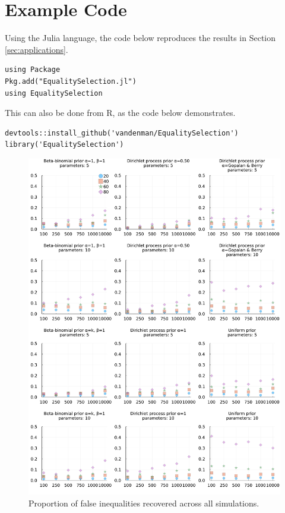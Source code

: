 \documentclass[11pt,a4paper]{article}
\theoremstyle{definition} %
\theoremstyle{case}
\begin{document}
\printbibliography

\newpage
\appendix

\section{Example Code} \label{sec:appendix-code}
Using the Julia language, the code below reproduces the results in Section \ref{sec:applications}.

\begin{verbatim}
using Package
Pkg.add("EqualitySelection.jl")
using EqualitySelection
\end{verbatim}

\noindent This can also be done from R, as the code below demonstrates.

\begin{verbatim}
devtools::install_github('vandenman/EqualitySelection')
library('EqualitySelection')
\end{verbatim}

\newpage

\begin{figure}
    \centering
    \includegraphics[width=\textwidth]{figures/simulation_results_test_clean_figures/simulation_appendix.pdf}
    \caption{Proportion of false inequalities recovered across all simulations.}
    \label{app_fig:big_simulation}
\end{figure}
\end{document}
